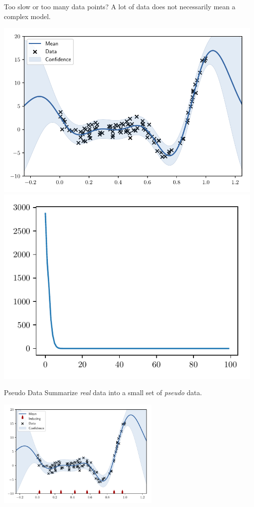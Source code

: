 \documentclass[14pt,aspectratio=1610]{beamer}
\begin{document}
\begin{frame}{Too slow or too many data points?}
A lot of data does not necessarily mean a complex model.
\begin{center}
\includegraphics[width=0.8\textheight]{gp_example_lots_data.pdf} 
\hfill
\includegraphics[width=0.74\textheight]{lots_data_eigen_values.pdf} 
\end{center}
\end{frame}

\begin{frame}{Pseudo Data}
Summarize \textit{real} data into a small set of \textit{pseudo} data.
\begin{center}
\includegraphics[width=0.6\textwidth]{sparsegp_example_lots_data.pdf} 
\end{center}
\end{frame}
\end{document}
